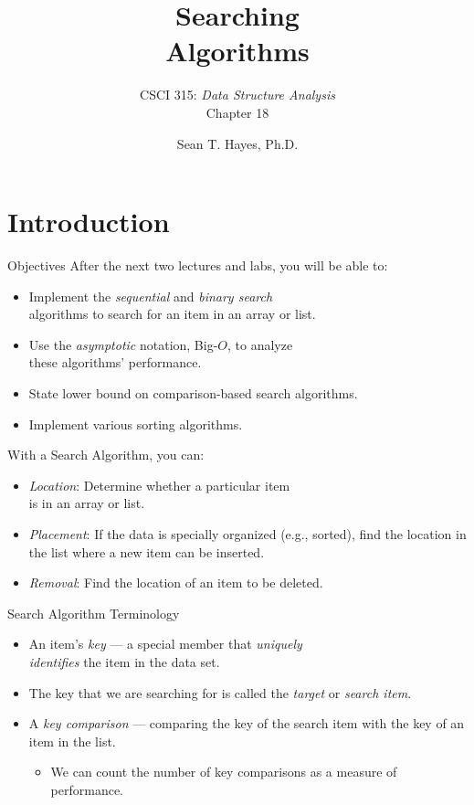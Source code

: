 \documentclass[14pt,aspectratio=1610]{beamer}
\title{\Huge{} Searching\\ Algorithms}
\subtitle{CSCI 315: \textit{Data Structure Analysis}\\Chapter 18}
\author{Sean T. Hayes, Ph.D.}
\institute{Charleston Southern University}
\begin{document}
\begin{frame}
  \titlepage{}
\end{frame}
\section{Introduction}

\begin{frame}{Objectives}
After the next two lectures and labs, you will be able to:
\begin{itemize}\setlength\itemsep{0.5em}
  \item
    Implement the \emph{sequential} and \emph{binary search}\\ algorithms to search for an item in an array or list.
  \item
    Use the \textit{asymptotic} notation, Big-\(O\), to analyze\\ these algorithms' performance.
  \item
    State lower bound on comparison-based search algorithms.
  \item
    Implement various sorting algorithms.
\end{itemize}
\end{frame}

\begin{frame}{With a Search Algorithm, you can:}
\begin{itemize}\setlength\itemsep{0.5em}
  \item
    \emph{Location}: Determine whether a particular item\\ is in an array or list.
  \item
    \emph{Placement}: If the data is specially organized (e.g., sorted), find the location in the list where a new item can be inserted.
  \item
    \emph{Removal}: Find the location of an item to be deleted.
\end{itemize}
\end{frame}

\begin{frame}{Search Algorithm Terminology}
\begin{itemize}
  \item
    An item's \emph{key} --- a special member that \textit{uniquely\\ identifies} the item in the data set.
  \item
    The key that we are searching for is called the \emph{target} or \emph{search item}.
  \item
    A \emph{key comparison} --- comparing the key of the search item with the key of an item in the list.
    \begin{itemize}
      \item
        We can count the number of key comparisons as a measure of performance.
    \end{itemize}
\end{itemize}
\end{frame}
\end{document}

